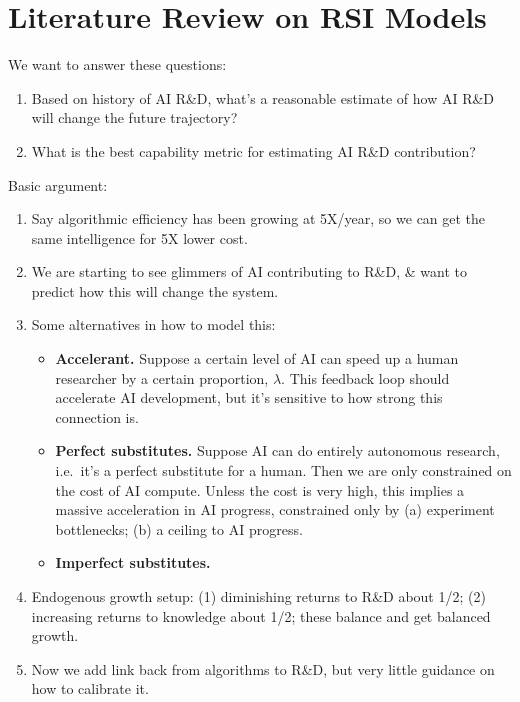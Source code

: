 \documentclass[
  11pt,
  letterpaper,
  DIV=11,
  numbers=noendperiod]{scrartcl}
\providecommand{\tightlist}{%
  \setlength{\itemsep}{0pt}\setlength{\parskip}{0pt}}
\begin{document}
\section{Literature Review on RSI
Models}\label{literature-review-on-rsi-models}

We want to answer these questions:

\begin{enumerate}
\def\labelenumi{\arabic{enumi}.}
\tightlist
\item
  Based on history of AI R\&D, what's a reasonable estimate of how AI
  R\&D will change the future trajectory?
\item
  What is the best capability metric for estimating AI R\&D
  contribution?
\end{enumerate}

Basic argument:

\begin{enumerate}
\def\labelenumi{\arabic{enumi}.}
\tightlist
\item
  Say algorithmic efficiency has been growing at 5X/year, so we can get
  the same intelligence for 5X lower cost.
\item
  We are starting to see glimmers of AI contributing to R\&D, \& want to
  predict how this will change the system.
\item
  Some alternatives in how to model this:

  \begin{itemize}
  \item
    \textbf{Accelerant.} Suppose a certain level of AI can speed up a
    human researcher by a certain proportion, \(\lambda\). This feedback
    loop should accelerate AI development, but it's sensitive to how
    strong this connection is.
  \item
    \textbf{Perfect substitutes.} Suppose AI can do entirely autonomous
    research, i.e.~it's a perfect substitute for a human. Then we are
    only constrained on the cost of AI compute. Unless the cost is very
    high, this implies a massive acceleration in AI progress,
    constrained only by (a) experiment bottlenecks; (b) a ceiling to AI
    progress.
  \item
    \textbf{Imperfect substitutes.}
  \end{itemize}
\item
  Endogenous growth setup: (1) diminishing returns to R\&D about 1/2;
  (2) increasing returns to knowledge about 1/2; these balance and get
  balanced growth.
\item
  Now we add link back from algorithms to R\&D, but very little guidance
  on how to calibrate it.
\end{enumerate}
\end{document}
